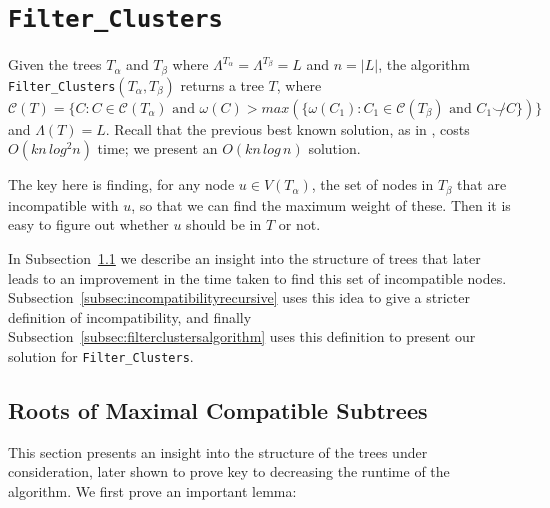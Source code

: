 \documentclass{article}
\newcommand{\compatible}{\smile}
\newcommand{\leafset}{\Lambda}
\newcommand{\weight}{\omega}
\newcommand{\TA}{T_\alpha}
\newcommand{\TB}{T_\beta}
\begin{document}
    \section{\texttt{Filter\_Clusters}}
    \label{sec:filterclusters}

    Given the trees $\TA$ and $\TB$ where $\leafset^{\TA} = \leafset^{\TB} = L$ and $n = |L|$, the algorithm \texttt{Filter\_Clusters}$(\TA, \TB)$ returns a tree $T$, where $\mathcal{C}(T) = \{C : C \in \mathcal{C}(\TA) \text{ and } \weight(C) > max(\{\weight(C_1) : C_1 \in \mathcal{C}(\TB) \text{ and } C_1 \not\compatible C\})\}$ and $\leafset(T) = L$. Recall that the previous best known solution, as in \cite{jansson2018algorithms}, costs $O(kn\,log^2n)$ time; we present an $O(kn\,log\,n)$ solution.

    The key here is finding, for any node $u \in V(\TA)$, the set of nodes in $\TB$ that are incompatible with $u$, so that we can find the maximum weight of these. Then it is easy to figure out whether $u$ should be in $T$ or not.

    In Subsection~\ref{subsec:rootsofsubtrees} we describe an insight into the structure of trees that later leads to an improvement in the time taken to find this set of incompatible nodes. Subsection~\ref{subsec:incompatibilityrecursive} uses this idea to give a stricter definition of incompatibility, and finally Subsection~\ref{subsec:filterclustersalgorithm} uses this definition to present our solution for \texttt{Filter\_Clusters}.

    \subsection{Roots of Maximal Compatible Subtrees}
    \label{subsec:rootsofsubtrees}

    This section presents an insight into the structure of the trees under consideration, later shown to prove key to decreasing the runtime of the algorithm. We first prove an important lemma:
    \newline
\end{document}
